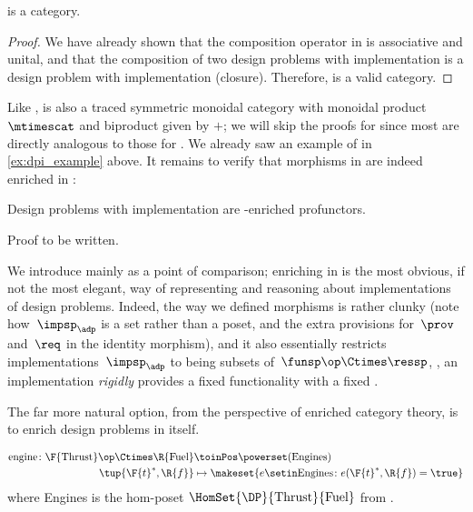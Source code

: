 {    \begin{lemma}\label{lem:DPI-is-category}
        \DPI is a category.
    \end{lemma}

    \begin{proof}
        We have already shown that the composition operator in \DPI is associative and unital, and that the composition of two design problems with implementation is a design problem with implementation (closure).
        Therefore, \DPI is a valid category.
    \end{proof}

    Like \DP, \DPI is also a traced symmetric monoidal category with monoidal product $\mtimescat$ and biproduct given by $+$;
    we will skip the proofs for \DPI since most are directly analogous to those for \DP.
    We already saw an example of \DPI in \cref{ex:dpi_example} above.
    It remains to verify that morphisms in \DPI are indeed enriched in \Set:

    \begin{proposition}
        Design problems with implementation are \Set-enriched profunctors.
    \end{proposition}
    \begin{publictodo}
        Proof to be written.
    \end{publictodo}
    We introduce \DPI mainly as a point of comparison; enriching in \Set is the most obvious, if not the most elegant, way of representing and reasoning about implementations of design problems.
    Indeed, the way we defined morphisms is rather clunky (note how~$\impsp_\adp$ is a set rather than a poset, and the extra provisions for~$\prov$ and~$\req$ in the identity morphism), and it also essentially restricts implementations~$\impsp_\adp$ to being subsets of~$\funsp\op \Ctimes \ressp$, \ie, an implementation \emph{rigidly} provides a fixed functionality \fun with a fixed \res.

    The far more natural option, from the perspective of enriched category theory, is to enrich design problems in \DP itself.

    \begin{example}
        \begin{equation}
            \begin{aligned}
                \text{engine} \colon \F{\text{Thrust}}\op \Ctimes \R{\text{Fuel}} & \toinPos \powerset(\text{Engines}) \\
                \tup{\F{t}^*,\R{f}}                                               & \mapsto \makeset{ e \setin \text{Engines} \colon e(\F{t}^*, \R{f}) = \true }
            \end{aligned}
        \end{equation}
        where Engines is the hom-poset $\HomSet{\DP}{\text{Thrust}}{\text{Fuel}}$ from \XXX. %
    \end{example}

}
